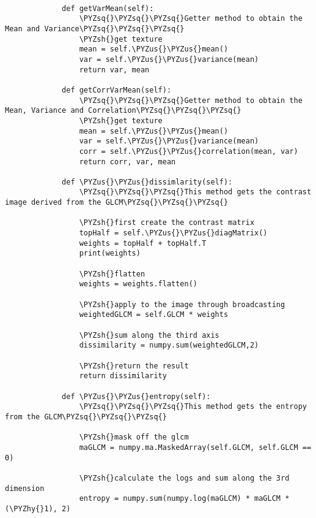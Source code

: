\documentclass[11pt]{article}
\def\PYZsq{\textquotesingle}%
\def\PYZus{\char`\_}
\def\PYZsh{\char`\#}
\def\PYZhy{\char`\-}
\def\PYZsq{\char`\'}
\begin{document}
\begin{Verbatim}[commandchars=\\\{\}]
             
             def getVarMean(self):
                 \PYZsq{}\PYZsq{}\PYZsq{}Getter method to obtain the Mean and Variance\PYZsq{}\PYZsq{}\PYZsq{}
                 \PYZsh{}get texture
                 mean = self.\PYZus{}\PYZus{}mean()
                 var = self.\PYZus{}\PYZus{}variance(mean)
                 return var, mean
                 
             def getCorrVarMean(self):
                 \PYZsq{}\PYZsq{}\PYZsq{}Getter method to obtain the Mean, Variance and Correlation\PYZsq{}\PYZsq{}\PYZsq{}
                 \PYZsh{}get texture
                 mean = self.\PYZus{}\PYZus{}mean()
                 var = self.\PYZus{}\PYZus{}variance(mean)
                 corr = self.\PYZus{}\PYZus{}correlation(mean, var)
                 return corr, var, mean
                              
             def \PYZus{}\PYZus{}dissimlarity(self):
                 \PYZsq{}\PYZsq{}\PYZsq{}This method gets the contrast image derived from the GLCM\PYZsq{}\PYZsq{}\PYZsq{}
                 
                 \PYZsh{}first create the contrast matrix
                 topHalf = self.\PYZus{}\PYZus{}diagMatrix()
                 weights = topHalf + topHalf.T
                 print(weights)
                 
                 \PYZsh{}flatten
                 weights = weights.flatten()
                  
                 \PYZsh{}apply to the image through broadcasting 
                 weightedGLCM = self.GLCM * weights 
                 
                 \PYZsh{}sum along the third axis
                 dissimilarity = numpy.sum(weightedGLCM,2)
                 
                 \PYZsh{}return the result
                 return dissimilarity
                 
             def \PYZus{}\PYZus{}entropy(self): 
                 \PYZsq{}\PYZsq{}\PYZsq{}This method gets the entropy from the GLCM\PYZsq{}\PYZsq{}\PYZsq{}
                 
                 \PYZsh{}mask off the glcm
                 maGLCM = numpy.ma.MaskedArray(self.GLCM, self.GLCM == 0)
                 
                 \PYZsh{}calculate the logs and sum along the 3rd dimension
                 entropy = numpy.sum(numpy.log(maGLCM) * maGLCM * (\PYZhy{}1), 2)
                 

\end{Verbatim}
\end{document}

